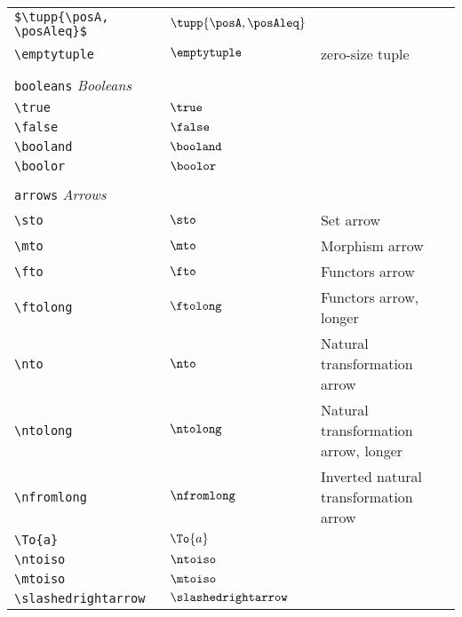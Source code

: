 \begin{longtable}{lll}
 {\color[rgb]{0.5,0.5,0.5}\texttt{\$\textbackslash tupp\{\textbackslash posA, \textbackslash posAleq\}\$}} & $\tupp{\posA, \posAleq}$ & \\ 
 {\color[rgb]{0.5,0.5,0.5}\texttt{\textbackslash emptytuple}} & $\emptytuple$ &  zero-size tuple\\ 
  &  & \\ 
 \multicolumn{3}{l}{{\color[rgb]{0.5,0.5,0.5}\texttt{booleans}} \emph{Booleans}}\\ 
 \hline
\hline
{\color[rgb]{0.5,0.5,0.5}\texttt{\textbackslash true}} & $\true$ & \\ 
 {\color[rgb]{0.5,0.5,0.5}\texttt{\textbackslash false}} & $\false$ & \\ 
 {\color[rgb]{0.5,0.5,0.5}\texttt{\textbackslash booland}} & $\booland$ & \\ 
 {\color[rgb]{0.5,0.5,0.5}\texttt{\textbackslash boolor}} & $\boolor$ & \\ 
  &  & \\ 
 \multicolumn{3}{l}{{\color[rgb]{0.5,0.5,0.5}\texttt{arrows}} \emph{Arrows}}\\ 
 \hline
\hline
{\color[rgb]{0.5,0.5,0.5}\texttt{\textbackslash sto}} & $\sto$ &  Set arrow\\ 
 {\color[rgb]{0.5,0.5,0.5}\texttt{\textbackslash mto}} & $\mto$ &  Morphism arrow\\ 
 {\color[rgb]{0.5,0.5,0.5}\texttt{\textbackslash fto}} & $\fto$ &  Functors arrow\\ 
 {\color[rgb]{0.5,0.5,0.5}\texttt{\textbackslash ftolong}} & $\ftolong$ &  Functors arrow, longer\\ 
 {\color[rgb]{0.5,0.5,0.5}\texttt{\textbackslash nto}} & $\nto$ &  Natural transformation arrow\\ 
 {\color[rgb]{0.5,0.5,0.5}\texttt{\textbackslash ntolong}} & $\ntolong$ &  Natural transformation arrow, longer\\ 
 {\color[rgb]{0.5,0.5,0.5}\texttt{\textbackslash nfromlong}} & $\nfromlong$ &  Inverted natural transformation arrow\\ 
 {\color[rgb]{0.5,0.5,0.5}\texttt{\textbackslash To\{a\}}} & $\To{a}$ & \\ 
 {\color[rgb]{0.5,0.5,0.5}\texttt{\textbackslash ntoiso}} & $\ntoiso$ & \\ 
 {\color[rgb]{0.5,0.5,0.5}\texttt{\textbackslash mtoiso}} & $\mtoiso$ & \\ 
 {\color[rgb]{0.5,0.5,0.5}\texttt{\textbackslash slashedrightarrow}} & $\slashedrightarrow$ & \\ 

\end{longtable}
